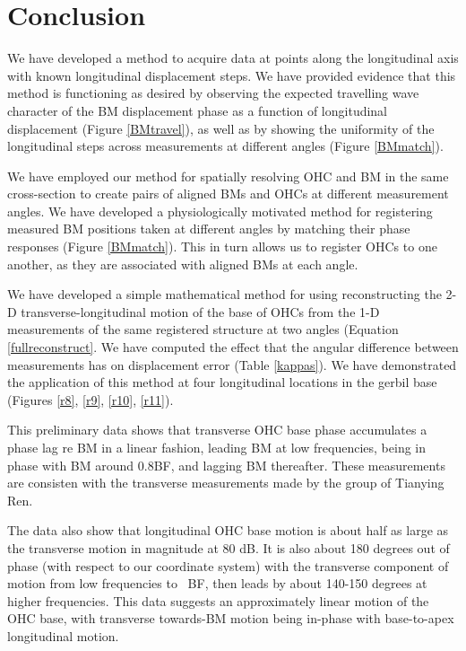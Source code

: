 \documentclass{article}
\begin{document}
\section{Conclusion}
\par{We have developed a method to acquire data at points along the longitudinal axis with known longitudinal displacement steps. We have provided evidence that this method is functioning as desired by observing the expected travelling wave character of the BM displacement phase as a function of longitudinal displacement (Figure \ref{BMtravel}), as well as by showing the uniformity of the longitudinal steps across measurements at different angles (Figure \ref{BMmatch}).}
\par{We have employed our method for spatially resolving OHC and BM in the same cross-section to create pairs of aligned BMs and OHCs at different measurement angles. We have developed a physiologically motivated method for registering measured BM positions taken at different angles by matching their phase responses (Figure \ref{BMmatch}). This in turn allows us to register OHCs to one another, as they are associated with aligned BMs at each angle.}
\par{We have developed a simple mathematical method for using reconstructing the 2-D transverse-longitudinal motion of the base of OHCs from the 1-D measurements of the same registered structure at two angles (Equation \ref{fullreconstruct}. We have computed the effect that the angular difference between measurements has on displacement error (Table \ref{kappas}). We have demonstrated the application of this method  at four longitudinal locations in the gerbil base (Figures \ref{r8}, \ref{r9}, \ref{r10}, \ref{r11}).}
\par{This preliminary data shows that transverse OHC base phase accumulates a phase lag re BM in a linear fashion, leading BM at low frequencies, being in phase with BM around 0.8BF, and lagging BM thereafter. These measurements are consisten with the transverse measurements made by the group of Tianying Ren.}
\par{The data also show that longitudinal OHC base motion is about half as large as the transverse motion in magnitude at 80 dB. It is also about 180 degrees out of phase (with respect to our coordinate system) with the transverse component of motion from low frequencies to ~BF, then leads by about 140-150 degrees at higher frequencies. This data suggests an approximately linear motion of the OHC base, with transverse towards-BM motion being in-phase with base-to-apex longitudinal motion.}
\end{document}
